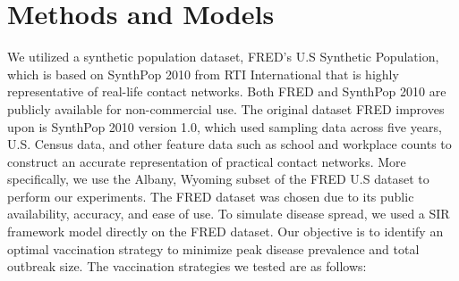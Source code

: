 \documentclass[9pt,twocolumn,twoside]{pnas-new}
\begin{document}
\section*{Methods and Models}
We utilized a synthetic population dataset, FRED's U.S Synthetic Population, which is based on SynthPop 2010 from RTI International that is highly representative of real-life contact networks. Both FRED and SynthPop 2010 are publicly available for non-commercial use. The original dataset FRED improves upon is SynthPop 2010 version 1.0, which used sampling data across five years, U.S. Census data, and other feature data such as school and workplace counts to construct an accurate representation of practical contact networks. More specifically, we use the Albany, Wyoming subset of the FRED U.S dataset to perform our experiments. The FRED dataset was chosen due to its public availability, accuracy, and ease of use. To simulate disease spread, we used a SIR framework model directly on the FRED dataset. Our objective is to identify an optimal vaccination strategy to minimize peak disease prevalence and total outbreak size. The vaccination strategies we tested are as follows:
\end{document}
